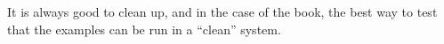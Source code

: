 \documentclass[krantz2]{krantz}\usepackage{knitr}%
\begin{document}
%
%
%
%
%
%
\begin{infobox}
It is always good to clean up, and in the case of the book, the best way to test that the examples
can be run in a ``clean'' system.

\begin{knitrout}\footnotesize
{}\color{fgcolor}\begin{kframe}
\begin{alltt}
\hlstd{(}\hlstd{,}  \hlstd{=} \hlstd{)}
\hlstd{(}\hlstd{,}  \hlstd{=} \hlstd{)}
\end{alltt}
\end{kframe}
\end{knitrout}
\end{infobox}
\end{document}
